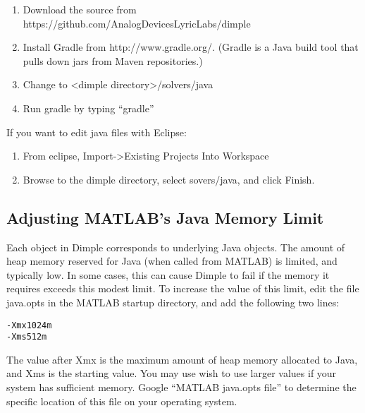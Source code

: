 \begin{enumerate}
\item Download the source from https://github.com/AnalogDevicesLyricLabs/dimple
\item Install Gradle from http://www.gradle.org/.  (Gradle is a Java build tool that pulls down jars from Maven repositories.)
\item Change to \textless dimple directory\textgreater /solvers/java 
\item Run gradle by typing ``gradle''
\end{enumerate}

If you want to edit java files with Eclipse:

\begin{enumerate}
\item From eclipse, Import-\textgreater Existing Projects Into Workspace
\item Browse to the dimple directory, select sovers/java, and click Finish.
\end{enumerate}



\ifmatlab

\subsection{Adjusting MATLAB's Java Memory Limit}

Each object in Dimple corresponds to underlying Java objects. The amount of heap memory reserved for Java (when called from MATLAB) is limited, and typically low.  In some cases, this can cause Dimple to fail if the memory it requires exceeds this modest limit.  To increase the value of this limit, edit the file java.opts in the MATLAB startup directory, and add the following two lines:

\begin{lstlisting}
-Xmx1024m
-Xms512m
\end{lstlisting}

The value after Xmx is the maximum amount of heap memory allocated to Java, and Xms is the starting value.  You may use wish to use larger values if your system has sufficient memory.  Google ``MATLAB java.opts file'' to determine the specific location of this file on your operating system.

\fi


